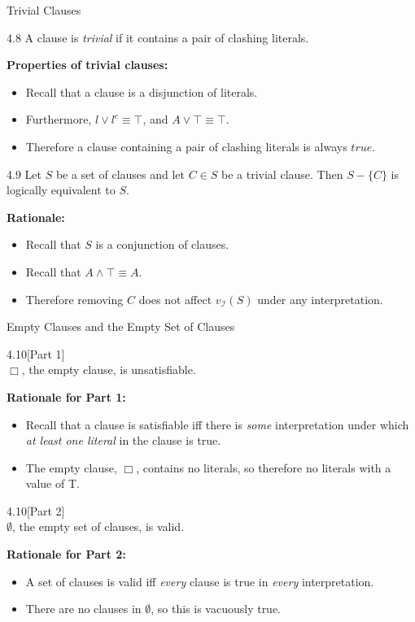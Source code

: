 \begin{wideslide}[bm=,toc=]{Trivial Clauses}
\begin{defn}{4.8}
A clause is \emph{trivial} if it contains a pair of clashing literals.
\end{defn}
\pause
\textbf{Properties of trivial clauses:}
\begin{itemize}
\item<3-> Recall that a clause is a disjunction of literals.
\item<4-> Furthermore, $l \lor l^c \equiv \top$, and $A \lor \top \equiv \top$.
\item<5-> Therefore a clause containing a pair of clashing literals is always $true$.
\end{itemize} 
\pause[4]
\begin{lem}{4.9}
Let $S$ be a set of clauses and let $C \in S$ be a trivial clause. Then $S -
\{C\}$ is logically equivalent to $S$.
\end{lem}
\pause
\textbf{Rationale:}
\begin{itemize}
\item<8-> Recall that $S$ is a conjunction of clauses.
\item<9-> Recall that $A \land \top \equiv A$.
\item<10-> Therefore removing $C$ does not affect $v_{\mathcal{I}}(S)$ under any
interpretation. 
\end{itemize}
\end{wideslide}

\begin{wideslide}[bm=,toc=]{Empty Clauses and the Empty Set of Clauses}
\begin{lem}{4.10}[Part 1]\label{lem:resolution}
~\\$\Box$, the empty clause, is unsatisfiable. 
\end{lem}
\pause
\textbf{Rationale for Part 1:}
\begin{itemize}
\item Recall that a clause is satisfiable iff there is \emph{some} interpretation
under which \emph{at least one literal} in the clause is true.
\item The empty clause, $\Box$, contains no literals, so therefore no literals with a value of T.
\end{itemize}

\pause
\begin{lem}{4.10}[Part 2]\label{lem:resolution}
~\\$\emptyset$, the empty set of clauses, is valid.
\end{lem}
\pause
\textbf{Rationale for Part 2:}
\begin{itemize}
\item A set of clauses is valid iff \emph{every} clause is true in
\emph{every} interpretation.
\item There are no clauses in $\emptyset$, so this is vacuously true.
\end{itemize}

\end{wideslide}


